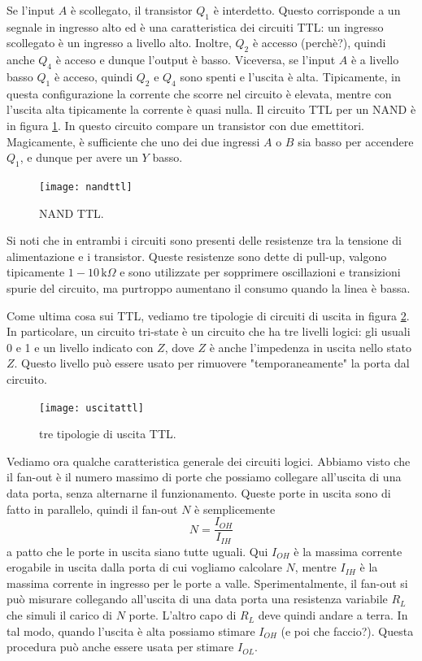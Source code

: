\documentclass[a4paper, 11pt]{article}
\renewcommand{\sf}{\textsf}
\begin{document}
Se l'input $A$ è scollegato, il transistor $Q_1$ è interdetto. Questo corrisponde a un segnale in ingresso alto ed è una caratteristica dei circuiti TTL: un ingresso scollegato è un ingresso a livello alto. Inoltre, $Q_2$ è accesso (perchè?), quindi anche $Q_4$ è acceso e dunque l'output è basso. Viceversa, se l'input $A$ è a livello basso $Q_1$ è acceso, quindi $Q_2$ e $Q_4$ sono spenti e l'uscita è alta. Tipicamente, in questa configurazione la corrente che scorre nel circuito è elevata, mentre con l'uscita alta tipicamente la corrente è quasi nulla. Il circuito TTL per un \sf{NAND} è in figura \ref{fig:nandttl}. In questo circuito compare un transistor con due emettitori. Magicamente, è sufficiente che uno dei due ingressi $A$ o $B$ sia basso per accendere $Q_1$, e dunque per avere un $Y$ basso.
\begin{figure}[h!]
	\centering
	\texttt{[image: nandttl]}
	\caption{\sf{NAND} TTL.}
	\label{fig:nandttl}
\end{figure}
Si noti che in entrambi i circuiti sono presenti delle resistenze tra la tensione di alimentazione e i transistor. Queste resistenze sono dette di pull-up, valgono tipicamente $1-10\,\mathrm{k}\Omega$ e sono utilizzate per sopprimere oscillazioni e transizioni spurie del circuito, ma purtroppo aumentano il consumo quando la linea è bassa.

Come ultima cosa sui TTL, vediamo tre tipologie di circuiti di uscita in figura \ref{fig:uscitattl}. In particolare, un circuito tri-state è un circuito che ha tre livelli logici: gli usuali 0 e 1 e un livello indicato con $Z$, dove $Z$ è anche l'impedenza in uscita nello stato $Z$. Questo livello può essere usato per rimuovere "temporaneamente" la porta dal circuito. %
\begin{figure}[h!]
	\centering
	\texttt{[image: uscitattl]}
	\caption{tre tipologie di uscita TTL.}
	\label{fig:uscitattl}
\end{figure}

Vediamo ora qualche caratteristica generale dei circuiti logici. Abbiamo visto che il fan-out è il numero massimo di porte che possiamo collegare all'uscita di una data porta, senza alternarne il funzionamento. Queste porte in uscita sono di fatto in parallelo, quindi il fan-out $N$ è semplicemente
\[N=\frac{I_{OH}}{I_{IH}}\]
a patto che le porte in uscita siano tutte uguali. Qui $I_{OH}$ è la massima corrente erogabile in uscita dalla porta di cui vogliamo calcolare $N$, mentre $I_{IH}$ è la massima corrente in ingresso per le porte a valle. Sperimentalmente, il fan-out si può misurare collegando all'uscita di una data porta una resistenza variabile $R_L$ che simuli il carico di $N$ porte. L'altro capo di $R_L$ deve quindi andare a terra. In tal modo, quando l'uscita è alta possiamo stimare $I_{OH}$ (e poi che faccio?). Questa procedura può anche essere usata per stimare $I_{OL}$.%
\end{document}
